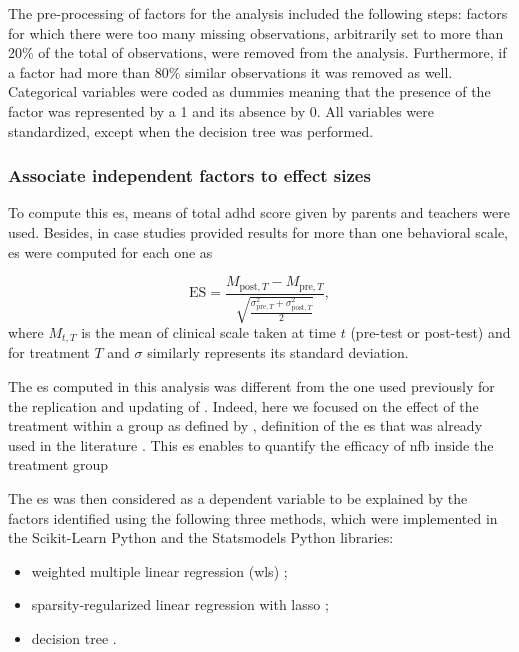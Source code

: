 The pre-processing of factors for the analysis included the following steps: factors for which there were too many missing observations, 
arbitrarily set to more than 20\% of the total of observations, were removed from the analysis. Furthermore, if a factor had more than 
80\% similar observations it was removed as well. Categorical variables were coded as dummies meaning that the presence of the factor was represented by a 1 
and its absence by 0. All variables were standardized, except when the decision tree was performed. 


\subsubsection{Associate independent factors to effect sizes}

To compute this \gls{es}, means of total \gls{adhd} score given by parents and teachers were used. Besides, in case studies provided results 
for more than one behavioral scale, \gls{es} were computed for each one as 

\begin{equation}
\label{eq:factors_effect_size_within_subject}
\text{ES} = \frac{M_{\text{post},T} - M_{\text{pre},T}}{\sqrt{\frac{\sigma_{\text{pre},T}^2 + \sigma_{\text{post},T}^2}{2}}},
\end{equation} 
where $M_{t,T}$ is the mean of clinical scale taken at time $t$ (pre-test or post-test) and for treatment $T$ and $\sigma$ similarly represents its standard deviation.

The \gls{es} computed in this analysis was different from the one 
used previously for the replication and updating of \citet{Cortese2016}. Indeed, here we focused on the effect of the treatment within 
a group as defined by \citet{Cohen1988}, definition of the \gls{es} that was already used in the literature \citep{Arns2009, Maurizio2014, 
Strehl2017}. This \gls{es} enables to quantify the efficacy of \gls{nfb} inside the treatment group 

The \gls{es} was then considered as a dependent variable to be explained by the factors identified using the following three methods, which were 
implemented in the Scikit-Learn Python \citep[0.18.1]{Pedregosa2011} and the Statsmodels Python \citep[0.8.0]{Seabold2010} libraries:
\begin{itemize}
	\item weighted multiple linear regression (\gls{wls}) \citep{Montgomery2012}; 
	\item sparsity-regularized linear regression with \gls{lasso} \citep{Tibshirani1996};
	\item decision tree \citep{Quinlan1986}.
\end{itemize}

